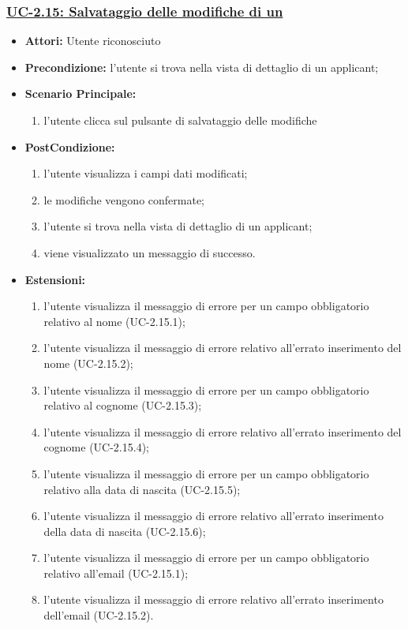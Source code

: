 \subsubsection{\underline{UC-2.15: Salvataggio delle modifiche di un \applicant}}
\begin{itemize}
	\item \textbf{Attori:} Utente riconosciuto
	\item \textbf{Precondizione:}  l'utente si trova nella vista di dettaglio di un applicant;
	\item \textbf{Scenario Principale:}
	\begin{enumerate}
		\item l'utente clicca sul pulsante di salvataggio delle modifiche
	\end{enumerate}
	\item \textbf{PostCondizione:} 
	\begin{enumerate}
		\item l'utente visualizza i campi dati modificati;
		\item le modifiche vengono confermate;
		\item l'utente si trova nella vista di dettaglio di un applicant;
		\item viene visualizzato un messaggio di successo.
	\end{enumerate}
	
	\item \textbf{Estensioni:} 
	\begin{enumerate}
		\item l'utente visualizza il messaggio di errore per un campo obbligatorio relativo al nome (UC-2.15.1);		
		\item l'utente visualizza il messaggio di errore relativo all'errato inserimento del nome (UC-2.15.2);
		\item l'utente visualizza il messaggio di errore per un campo obbligatorio relativo al cognome (UC-2.15.3);
		\item l'utente visualizza il messaggio di errore relativo all'errato inserimento del cognome (UC-2.15.4);
		\item l'utente visualizza il messaggio di errore per un campo obbligatorio relativo alla data di nascita (UC-2.15.5);		
		\item l'utente visualizza il messaggio di errore relativo all'errato inserimento della data di nascita (UC-2.15.6);	
		\item l'utente visualizza il messaggio di errore per un campo obbligatorio relativo all'email (UC-2.15.1);		
		\item l'utente visualizza il messaggio di errore relativo all'errato inserimento dell'email (UC-2.15.2).
	\end{enumerate}
\end{itemize}

